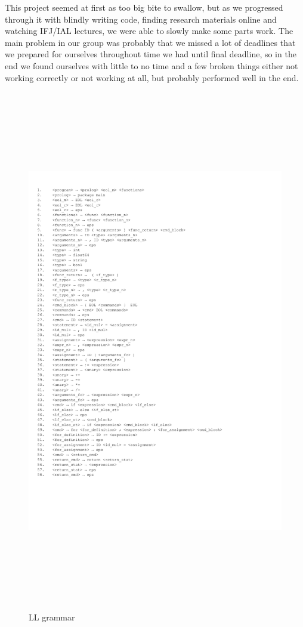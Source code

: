 \documentclass[11pt, titlepage]{article}
\begin{document}
This project seemed at first as too big bite to swallow, but as we
progressed through it with blindly writing code, finding research
materials online and watching IFJ/IAL lectures, we were able to slowly
make some parts work. The main problem in our group was probably that we
missed a lot of deadlines that we prepared for ourselves throughout time
we had until final deadline, so in the end we found ourselves with
little to no time and a few broken things either not working correctly
or not working at all, but probably performed well in the end.


\begin{center}
	\begin{figure}
		\includegraphics[width=\linewidth, height=650pt]{LL_grammar}
		\caption{LL grammar}
		\label{fig:LLgramar}
	\end{figure}
\end{center}
\end{document}
